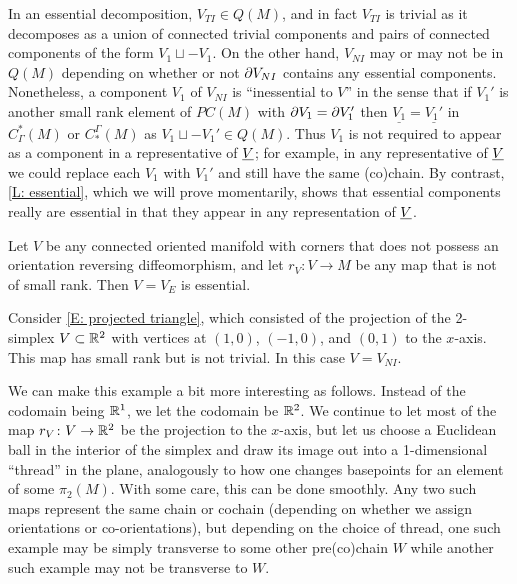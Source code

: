In an essential decomposition, $V_{TI} \in Q(M)$, and in fact $V_{TI}$ is trivial as it decomposes as a union of connected trivial components and pairs of connected components of the form $V_1 \sqcup -V_1$.
On the other hand, $V_{NI}$ may or may not be in $Q(M)$ depending on whether or not $\partial V_{NI}$
contains any essential components.
Nonetheless, a component $V_1$ of $V_{NI}$ is ``inessential to $V$'' in the sense that if $V_1'$ is another small rank element of $PC(M)$ with $\partial V_1 = \partial V_1'$ then $\underline{V_1} = \underline{V_1'}$ in $C_\Gamma^*(M)$ or $C_*^\Gamma(M)$ as $V_1 \sqcup -V_1' \in Q(M)$.
Thus $V_1$ is not required to appear as a component in a representative of $\underline{V}$; for example, in any representative of $\underline{V}$ we could replace each $V_1$ with $V_1'$ and still have the same (co)chain.
By contrast, \cref{L: essential}, which we will prove momentarily, shows that essential components really are essential in that they appear in any representation of $\underline{V}$.

\begin{example}
	Let $V$ be any connected oriented manifold with corners that does not possess an orientation reversing diffeomorphism, and let $r_V \colon V \to M$ be any map that is not of small rank.
	Then $V = V_E$ is essential.
\end{example}

\begin{example}\label{E: bad transversality}
	Consider \cref{E: projected triangle}, which consisted of the projection of the 2-simplex $V \subset \mathbb{R}^2$ with vertices at $(1,0)$, $(-1,0)$, and $(0,1)$ to the $x$-axis.
	This map has small rank but is not trivial.
	In this case $V = V_{NI}$.

	We can make this example a bit more interesting as follows.
	Instead of the codomain being $\mathbb{R}^1$, we let the codomain be $\mathbb{R}^2$.
	We continue to let most of the map $r_V \colon V \to \mathbb{R}^2$ be the projection to the $x$-axis, but let us choose a Euclidean ball in the interior of the simplex and draw its image out into a 1-dimensional ``thread'' in the plane, analogously to how one changes basepoints for an element of some $\pi_2(M)$.
	With some care, this can be done smoothly.
	Any two such maps represent the same chain or cochain (depending on whether we assign orientations or co-orientations), but depending on the choice of thread, one such example may be simply transverse to some other pre(co)chain $W$ while another such example may not be transverse to $W$.
\end{example}

